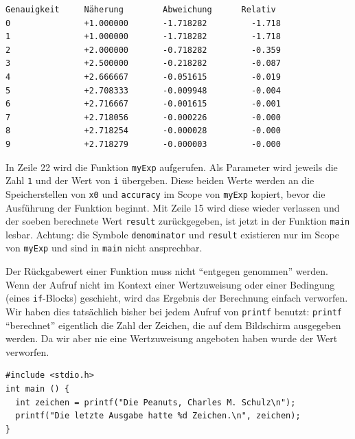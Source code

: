\begin{cmdbox}
\begin{verbatim}
Genauigkeit     Näherung        Abweichung      Relativ
0               +1.000000       -1.718282         -1.718
1               +1.000000       -1.718282         -1.718
2               +2.000000       -0.718282         -0.359
3               +2.500000       -0.218282         -0.087
4               +2.666667       -0.051615         -0.019
5               +2.708333       -0.009948         -0.004
6               +2.716667       -0.001615         -0.001
7               +2.718056       -0.000226         -0.000
8               +2.718254       -0.000028         -0.000
9               +2.718279       -0.000003         -0.000
\end{verbatim}
\end{cmdbox}


In Zeile 22 wird die Funktion \texttt{myExp} aufgerufen. Als Parameter wird jeweils die Zahl \texttt{1} und der Wert von \texttt{i} übergeben. Diese beiden Werte werden an die Speicherstellen von \texttt{x0} und \texttt{accuracy} im Scope von \texttt{myExp} kopiert, bevor die Ausführung der Funktion beginnt. Mit Zeile 15 wird diese wieder verlassen und der soeben berechnete Wert \texttt{result} zurückgegeben, \ie ist jetzt in der Funktion \texttt{main} lesbar. Achtung: die Symbole \texttt{denominator} und \texttt{result} existieren nur im Scope von \texttt{myExp} und sind in \texttt{main} nicht ansprechbar.

Der Rückgabewert einer Funktion muss nicht \enquote{entgegen genommen} werden. Wenn der Aufruf nicht im Kontext einer Wertzuweisung oder einer Bedingung (\eg eines \texttt{if}-Blocks) geschieht, wird das Ergebnis der Berechnung einfach verworfen. Wir haben dies tatsächlich bisher bei jedem Aufruf von \texttt{printf} benutzt: \texttt{printf} \enquote{berechnet} eigentlich die Zahl der Zeichen, die auf dem Bildschirm ausgegeben werden. Da wir aber nie eine Wertzuweisung angeboten haben wurde der Wert verworfen.

\begin{codebox}
\begin{verbatim}
#include <stdio.h>
int main () {
  int zeichen = printf("Die Peanuts, Charles M. Schulz\n");
  printf("Die letzte Ausgabe hatte %d Zeichen.\n", zeichen);
}
\end{verbatim}
\end{codebox}

